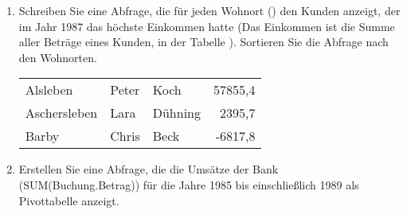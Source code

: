\begin{enumerate}
\begin{center}
\begin{small}
          \end{small}
        \end{center}
        \item Schreiben Sie eine Abfrage, die für jeden Wohnort
        () den Kunden anzeigt, der im Jahr 1987 das
        höchste Einkommen hatte (Das Einkommen ist die Summe aller Beträge
        eines Kunden, in der Tabelle ). Sortieren Sie die
        Abfrage nach den Wohnorten.
        \begin{center}
          \begin{small}
            \tablehead{}
            \begin{msoraclesql}
              \begin{supertabular}{lllr}
                Alsleben & Peter & Koch & 57855,4 \\
                Aschersleben & Lara & Dühning & 2395,7 \\
                Barby & Chris & Beck & -6817,8 \\
              \end{supertabular}
            \end{msoraclesql}
          \end{small}
        \end{center}
        \item Erstellen Sie eine Abfrage, die die Umsätze der Bank
        (SUM(Buchung.Betrag)) für die Jahre 1985 bis einschließlich 1989
        als Pivottabelle anzeigt.
        \begin{center}
          \begin{small}
\end{small}
\end{center}
\end{enumerate}
